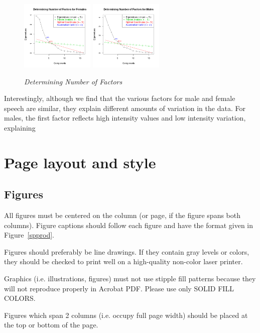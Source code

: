 \documentclass[a4paper]{article}
\begin{document}
\begin{figure}[t]
\includegraphics[width = 3.5cm]{graphics/ScreeFem.png}
\includegraphics[width = 3.5cm]{graphics/ScreeMale.png}
\caption{{\it Determining Number of Factors}}  
\end{figure}

Interestingly, although we find that the various factors for male and female speech are similar, they explain different amounts of variation in the data.  For males, the first factor reflects high intensity values and low intensity variation, explaining   

\section{Page layout and style}

\subsection{Figures}

All figures must be centered on the column (or page, if the figure spans 
both columns).
Figure captions should follow each figure and have the format given in 
Figure~\ref{spprod}.

Figures should preferably be line drawings. If they contain gray 
levels or colors, they should be checked to print well on a 
high-quality non-color laser printer.

Graphics (i.e. illustrations, figures) must not use stipple fill
patterns because they will not reproduce properly in Acrobat PDF.
Please use only SOLID FILL COLORS.

Figures which span 2 columns (i.e. occupy full page width) should be
placed at the top or bottom of the page.
\end{document}
